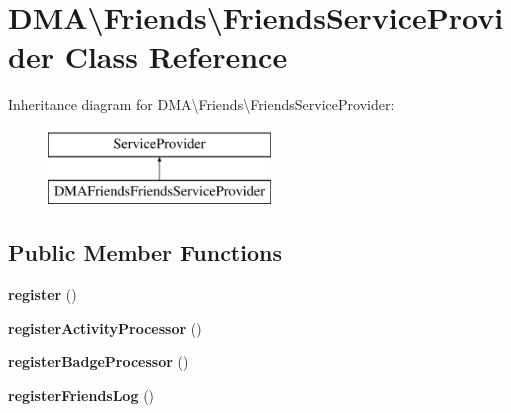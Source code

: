 \hypertarget{classDMA_1_1Friends_1_1FriendsServiceProvider}{\section{D\-M\-A\textbackslash{}Friends\textbackslash{}Friends\-Service\-Provider Class Reference}
\label{classDMA_1_1Friends_1_1FriendsServiceProvider}
}
Inheritance diagram for D\-M\-A\textbackslash{}Friends\textbackslash{}Friends\-Service\-Provider\-:\begin{figure}[H]
\begin{center}
\leavevmode
\includegraphics[height=2.000000cm]{df/d6d/classDMA_1_1Friends_1_1FriendsServiceProvider}
\end{center}
\end{figure}
\subsection*{Public Member Functions}
\begin{DoxyCompactItemize}
\item 
\hypertarget{classDMA_1_1Friends_1_1FriendsServiceProvider_a6a90d2cdc4c6b153b45764ba66e154ae}{{\bfseries register} ()}\label{classDMA_1_1Friends_1_1FriendsServiceProvider_a6a90d2cdc4c6b153b45764ba66e154ae}

\item 
\hypertarget{classDMA_1_1Friends_1_1FriendsServiceProvider_acac19246d5282897b8e0ce6265ed5ef3}{{\bfseries register\-Activity\-Processor} ()}\label{classDMA_1_1Friends_1_1FriendsServiceProvider_acac19246d5282897b8e0ce6265ed5ef3}

\item 
\hypertarget{classDMA_1_1Friends_1_1FriendsServiceProvider_a8c3cfb466bb9300f3909797a6b58b634}{{\bfseries register\-Badge\-Processor} ()}\label{classDMA_1_1Friends_1_1FriendsServiceProvider_a8c3cfb466bb9300f3909797a6b58b634}

\item 
\hypertarget{classDMA_1_1Friends_1_1FriendsServiceProvider_a2d6ff7101ca6389c00e298f2d594a1df}{{\bfseries register\-Friends\-Log} ()}\label{classDMA_1_1Friends_1_1FriendsServiceProvider_a2d6ff7101ca6389c00e298f2d594a1df}

\end{DoxyCompactItemize}
